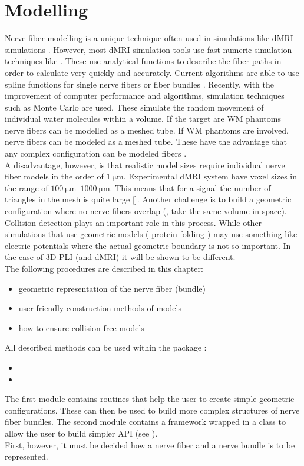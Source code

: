 \setcounter{chapter}{4}
\chapter{Modelling}
\label{chap:modelling}
% 
% 
Nerve fiber modelling is a unique technique often used in simulations like \ac{dMRI}-simulations \dummy{}.
However, most \ac{dMRI} simulation tools use fast numeric simulation techniques like \dummy{}.
These use analytical functions to describe the fiber paths in order to calculate very quickly and accurately.
Current algorithms are able to use spline functions for single nerve fibers or fiber bundles \cite{Balls2009}.
Recently, with the improvement of computer performance and algorithms, simulation techniques such as Monte Carlo \dummy{} are used.
These simulate the random movement of individual water molecules within a volume.
If the target are \ac{WM} phantoms nerve fibers can be modelled as a meshed tube.
If \ac{WM} phantoms are involved, nerve fibers can be modeled as a meshed tube.
These have the advantage that any complex configuration can be modeled \eg{} fibers \dummy{}.
\\
%
A disadvantage, however, is that realistic model sizes require individual nerve fiber models in the order of $\SI{1}{\micro\meter}$.
Experimental \ac{dMRI} system have voxel sizes in the range of $\SIrange{100}{1000}{\micro\meter}$.
This means that for a signal the number of triangles in the mesh is quite large [\dummy{}].
Another challenge is to build a geometric configuration where no nerve fibers overlap (\ie{}, take the same volume in space).
\\
% 
Collision detection plays an important role in this process.
While other simulations that use geometric models (\eg{} protein folding \dummy{}) may use something like electric potentials where the actual geometric boundary is not so important.
In the case of \ac{3D-PLI} (and \ac{dMRI}) it will be shown to be different.
\\[\baselineskip]
% 
The following procedures are described in this chapter:
\begin{itemize}[nosep]
    \item geometric representation of the nerve fiber (bundle)
    \item user-friendly construction methods of models
    \item how to ensure collision-free models
\end{itemize}
% 
All described methods can be used within the package :
% 
\begin{itemize}[nosep]
    \item {}
    \item {}
\end{itemize}
% 
The first module  contains routines that help the user to create simple geometric configurations.
These can then be used to build more complex structures of nerve fiber bundles.
The second module  contains a \cpp{} framework wrapped in a \python{} class to allow the user to build simpler \ac{API} (see \dummy{}).
\\
% 
First, however, it must be decided how a nerve fiber and a nerve bundle is to be represented.
% 
% 
% 
